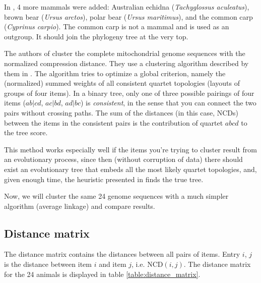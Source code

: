 In \cite{Cilibrasi2005}, 4 more mammals were added: Australian echidna
(\emph{Tachyglossus aculeatus}), brown bear (\emph{Ursus arctos}), polar
bear (\emph{Ursus maritimus}), and the common carp (\emph{Cyprinus
carpio}). The common carp is not a mammal and is used as an outgroup. It
should join the phylogeny tree at the very top.

The authors of \cite{Cilibrasi2005} cluster the complete mitochondrial
genome sequences with the normalized compression distance. They use
a clustering algorithm described by them in
\cite{Cilibrasi2011}. The algorithm tries to optimize a global criterion,
namely the (normalized) summed weights of all consistent quartet
topologies (layouts of groups of four items). In a binary tree, only one
of three possible pairings of four items ($ab|cd$, $ac|bd$, $ad|bc$) is
\emph{consistent}, in the sense that you can connect the two pairs without
crossing paths. The sum of the distances (in this case, $\text{NCD}$s)
between the items in the consistent pairs is the contribution of quartet
$abcd$ to the tree score.

This method works especially well if the items you're trying to cluster
result from an evolutionary process, since then (without corruption of
data) there should exist an evolutionary tree that embeds all the most
likely quartet topologies, and, given enough time, the heuristic presented
in \cite{Cilibrasi2011} finds the true tree.

Now, we will cluster the same 24 genome sequences with a much simpler
algorithm (average linkage) and compare results.

\subsection{Distance matrix}

The distance matrix contains the distances between all pairs of items.
Entry $i$, $j$ is the distance between item $i$ and item $j$, i.e.
$\text{NCD}(i, j)$. The distance matrix for the 24 animals is displayed in
table \ref{table:distance_matrix}.

